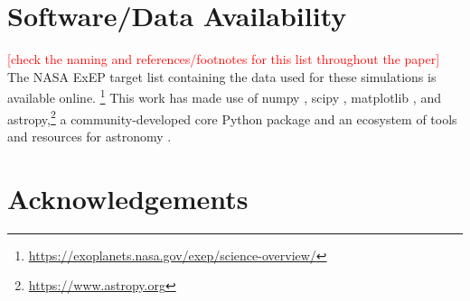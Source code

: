 \documentclass[
    usenatbib,
]{mnras}
\newcommand{\todo}[1]{\textcolor{red}{[#1]}}
\newcommand{\IWA}{\ensuremath{\mathrm{IWA}}}
\newcommand{\hwo}{HabWorlds}
\begin{document}
%
%
%

\section*{Software/Data Availability}

\todo{check the naming and references/footnotes for this list throughout the paper}
The NASA ExEP target list containing the data used for these simulations is  available online.%
\footnote{\url{https://exoplanets.nasa.gov/exep/science-overview/}}
This work has made use of \textsf{numpy}
 \citep{NumPy2020}, \textsf{scipy} \citep{scipy_2020}, \textsf{matplotlib} \citep{matplotlib2007}, and \textsf{astropy},\footnote{\url{https://www.astropy.org}} a community-developed core Python package and an ecosystem of tools and resources for astronomy \citep{astropy:2013, astropy:2018, astropy:2022}.

\section*{Acknowledgements}
\end{document}
